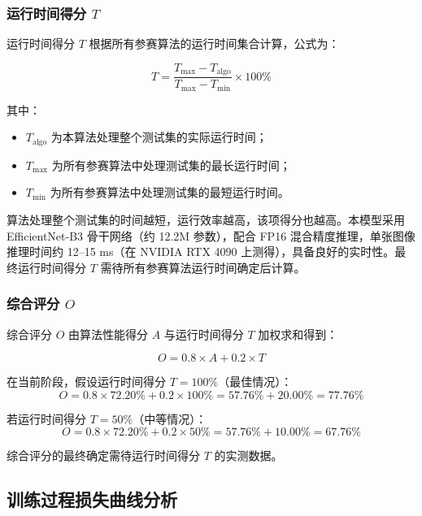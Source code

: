 \documentclass[UTF8]{ctexart}
\begin{document}
\subsubsection{运行时间得分 \(T\)}

运行时间得分 \(T\) 根据所有参赛算法的运行时间集合计算，公式为：

\begin{equation}
    T = \frac{T_{\max} - T_{\text{algo}}}{T_{\max} - T_{\min}} \times 100\%
\end{equation}

其中：
\begin{itemize}
    \item \(T_{\text{algo}}\) 为本算法处理整个测试集的实际运行时间；
    \item \(T_{\max}\) 为所有参赛算法中处理测试集的最长运行时间；
    \item \(T_{\min}\) 为所有参赛算法中处理测试集的最短运行时间。
\end{itemize}

算法处理整个测试集的时间越短，运行效率越高，该项得分也越高。本模型采用 EfficientNet-B3 骨干网络（约 12.2M 参数），配合 FP16 混合精度推理，单张图像推理时间约 12--15 ms（在 NVIDIA RTX 4090 上测得），具备良好的实时性。最终运行时间得分 \(T\) 需待所有参赛算法运行时间确定后计算。

\subsubsection{综合评分 \(O\)}

综合评分 \(O\) 由算法性能得分 \(A\) 与运行时间得分 \(T\) 加权求和得到：

\begin{equation}
    O = 0.8 \times A + 0.2 \times T
\end{equation}

在当前阶段，假设运行时间得分 \(T = 100\%\)（最佳情况）：
\begin{equation}
    O = 0.8 \times 72.20\% + 0.2 \times 100\% = 57.76\% + 20.00\% = 77.76\%
\end{equation}

若运行时间得分 \(T = 50\%\)（中等情况）：
\begin{equation}
    O = 0.8 \times 72.20\% + 0.2 \times 50\% = 57.76\% + 10.00\% = 67.76\%
\end{equation}

综合评分的最终确定需待运行时间得分 \(T\) 的实测数据。

\subsection{训练过程损失曲线分析}
\end{document}
